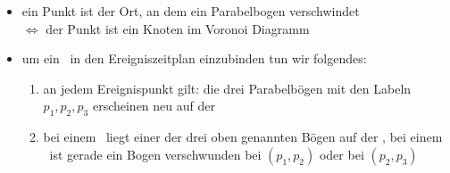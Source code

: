 \begin{itemize}
\begin{description}
\begin{description}
\begin{description}
\begin{itemize}
									\item ein Punkt ist der Ort, an dem ein Parabelbogen verschwindet\\ $\Longleftrightarrow$ der Punkt ist ein Knoten im Voronoi Diagramm
									\item um ein \kreis~in den Ereigniszeitplan einzubinden tun wir folgendes:
										\begin{enumerate}
											\item an jedem Ereignispunkt gilt: die drei Parabelbögen mit den Labeln $p_1,p_2,p_3$ erscheinen neu auf der \beach
											\item bei einem \site~liegt einer der drei oben genannten Bögen auf der \sweep, bei einem \kreis~ist gerade ein Bogen verschwunden bei $(p_1,p_2)$ oder bei $(p_2,p_3)$
											\setcounter{temp}{\value{enumi}}
										\end{enumerate}
								\end{itemize}
						\end{description}
				\end{description}
		\end{description}
\end{itemize}
\topbreak
\up\up\up\up
